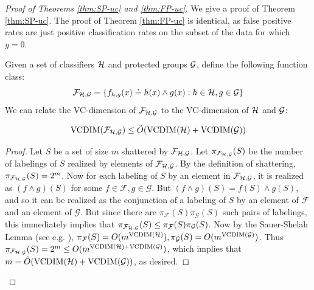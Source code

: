 \begin{proof}[Proof of Theorems \ref{thm:SP-uc} and \ref{thm:FP-uc}]
We give a proof of Theorem \ref{thm:SP-uc}. The proof of Theorem \ref{thm:FP-uc} is identical, as false positive rates are just positive classification rates on the subset of the data for which $y = 0$.

Given a set of classifiers $\mathcal{H}$ and protected groups $\mathcal{G}$, define the following function class:
$$\mathcal{F}_{\mathcal{H}, \mathcal{G}} = \{f_{h,g}(x) \doteq h(x) \wedge g(x) : h \in \mathcal{H}, g \in \mathcal{G}\}$$
We can relate the VC-dimension of $\mathcal{F}_{\mathcal{H},\mathcal{G}}$ to the VC-dimension of $\mathcal{H}$ and $\mathcal{G}$:
\begin{claim}
$$\mathrm{VCDIM}(\mathcal{F}_{\mathcal{H}, \mathcal{G}}) \leq \tilde{O}(\mathrm{VCDIM}(\mathcal{H}) + \mathrm{VCDIM}(\mathcal{G}))$$
\end{claim}
\begin{proof}
Let $S$ be a set of size $m$ shattered by $\mathcal{F}_{\mathcal{H}, \mathcal{G}}$. Let $\pi_{\mathcal{F}_{\mathcal{H}, \mathcal{G}}}(S)$ be the number of labelings of $S$ realized by elements of $\mathcal{F}_{\mathcal{H}, \mathcal{G}}$. By the definition of shattering, $\pi_{\mathcal{F}_{\mathcal{H}, \mathcal{G}}}(S) = 2^{m}$. Now for each labeling of $S$ by an element in $\mathcal{F}_{\mathcal{H}, \mathcal{G}}$, it is realized as $(f \wedge g)(S)$ for some $f \in \mathcal{F}, g \in \mathcal{G}$. But $(f \wedge g)(S) = f(S) \wedge g(S)$, and so it can be realized as the conjunction of a labeling of $S$ by an element of $\mathcal{F}$ and an element of $\mathcal{G}$. But since there are $\pi_{\mathcal{F}}(S)\pi_{\mathcal{G}}(S)$ such pairs of labelings, this immediately implies that $\pi_{\mathcal{F}_{\mathcal{H}, \mathcal{G}}}(S) \leq \pi_{\mathcal{F}}(S)\pi_{\mathcal{G}}(S)$. Now by the Sauer-Shelah Lemma (see e.g. \cite{KV94}), $\pi_{\mathcal{F}}(S) = O(m^{\mathrm{VCDIM}(\mathcal{H})}), \pi_{\mathcal{G}}(S) = O(m^{\mathrm{VCDIM}(\mathcal{G})})$. Thus $\pi_{\mathcal{F}_{\mathcal{H}, \mathcal{G}}}(S) = 2^{m} \leq O(m^{\mathrm{VCDIM}(\mathcal{H}) + \mathrm{VCDIM}(\mathcal{G})})$, which implies that $m = \tilde{O}(\mathrm{VCDIM}(\mathcal{H}) + \mathrm{VCDIM}(\mathcal{G}))$, as desired.



\end{proof}
\end{proof}
